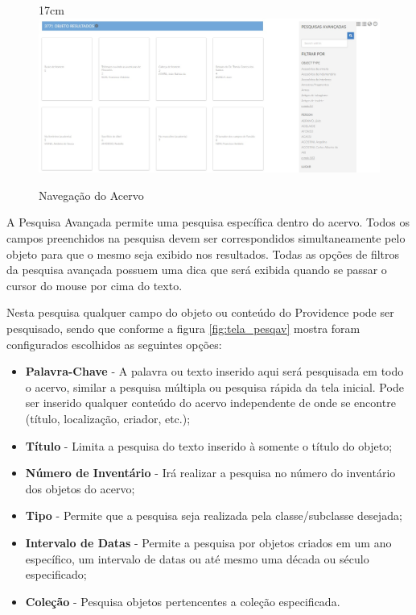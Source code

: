 \documentclass[a4paper,12pt,oneside,onecolumn,final,fleqn]{repUERJ}
\begin{document}
\begin{figure}[!ht]{17cm}
	\includegraphics[width=15cm, center]{figuras/pawtucket_navegarobjetos.jpg}
	\caption{Navegação do Acervo} \label{fig:tela_navobj}
\end{figure}

A Pesquisa Avançada permite uma pesquisa específica dentro do acervo. Todos os campos preenchidos na pesquisa devem ser correspondidos simultaneamente pelo objeto para que o mesmo seja exibido nos resultados. Todas as opções de filtros da pesquisa avançada possuem uma dica que será exibida quando se passar o cursor do mouse por cima do texto.

Nesta pesquisa qualquer campo do objeto ou conteúdo do Providence pode ser pesquisado, sendo que conforme a figura \ref{fig:tela_pesqav} mostra foram configurados escolhidos as seguintes opções:

\begin{itemize}
	\item \textbf{Palavra-Chave} - A palavra ou texto inserido aqui será pesquisada em todo o acervo, similar a pesquisa múltipla ou pesquisa rápida da tela inicial. Pode ser inserido qualquer conteúdo do acervo independente de onde se encontre (título, localização, criador, etc.);
	\item \textbf{Título} - Limita a pesquisa do texto inserido à somente o título do objeto;
	\item \textbf{Número de Inventário} - Irá realizar a pesquisa no número do inventário dos objetos do acervo;
	\item \textbf{Tipo} - Permite que a pesquisa seja realizada pela classe/subclasse desejada;
	\item \textbf{Intervalo de Datas} - Permite a pesquisa por objetos criados em um ano específico, um intervalo de datas ou até mesmo uma década ou século especificado;
	\item \textbf{Coleção} - Pesquisa objetos pertencentes a coleção especificada.
\end{itemize}
\end{document}
